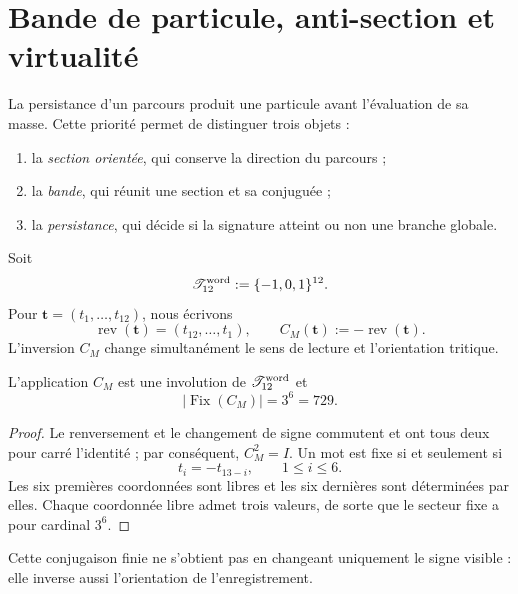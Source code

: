 \chapter{Bande de particule, anti-section et virtualité}
\label{chap:banda-particula-virtual}

La persistance d’un parcours produit une particule avant l’évaluation de sa masse. Cette priorité permet de distinguer trois objets :

\begin{enumerate}
\item la \emph{section orientée}, qui conserve la direction du parcours ;
\item la \emph{bande}, qui réunit une section et sa conjuguée ;
\item la \emph{persistance}, qui décide si la signature atteint ou non une branche globale.
\end{enumerate}

\begin{definition}
\label{def:palabras-cm}
Soit
\[
 \mathscr T_{12}^{\rm word}:=\{-1,0,1\}^{12}.
\]
Pour \(\mathbf t=(t_1,\ldots,t_{12})\), nous écrivons
\[
 \operatorname{rev}(\mathbf t)
 =(t_{12},\ldots,t_1),
 \qquad
 C_M(\mathbf t):=-\operatorname{rev}(\mathbf t).
\]
L’inversion \(C_M\) change simultanément le sens de lecture et l’orientation tritique.
\end{definition}

\begin{theorem}
\label{thm:involucion-cm-censo} L’application \(C_M\) est une involution de \(\mathscr T_{12}^{\rm word}\) et
\[
 \left|\operatorname{Fix}(C_M)\right|=3^6=729.
\]
\end{theorem}

\begin{proof}
Le renversement et le changement de signe commutent et ont tous deux pour carré l’identité ; par conséquent, \(C_M^2=I\). Un mot est fixe si et seulement si
\[
 t_i=-t_{13-i},\qquad 1\leq i\leq6.
\]
Les six premières coordonnées sont libres et les six dernières sont déterminées par elles. Chaque coordonnée libre admet trois valeurs, de sorte que le secteur fixe a pour cardinal \(3^6\).
\end{proof}

Cette conjugaison finie ne s’obtient pas en changeant uniquement le signe visible : elle inverse aussi l’orientation de l’enregistrement.

